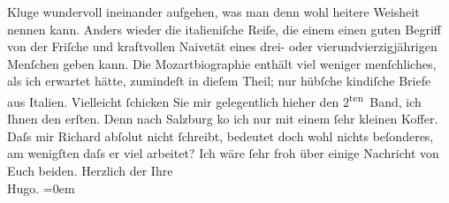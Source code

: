 \begin{ledgroupsized}[t]{13cm}
                    Kluge wundervoll ineinander aufgehen, was man denn wohl heitere {\pb}Weisheit nennen kann. Anders
                    wieder die italieniſche Reiſe, die einem einen
                    guten Begriff von der Friſche und kraftvollen Naivetät eines drei- oder
                    vierundvierzigjährigen Menſchen geben kann.\pend
           \pstart
           Die Mozartbiographie enthält viel
                    weniger menſchliches, als ich erwartet hätte, zumindeſt in dieſem Theil; nur
                    hübſche kindiſche Briefe aus Italien.
                    Vielleicht ſchicken Sie mir gelegentlich hieher den 2\textsuperscript{ten} Band, ich Ihnen {\pb}den erſten. Denn nach Salzburg ko{\geminationm} ich nur mit einem ſehr kleinen Koffer. Daſs mir
                        Richard abſolut nicht ſchreibt, bedeutet
                    doch wohl nichts beſonderes, am wenigſten daſs er viel arbeitet?\pend
           \pstart
           Ich wäre ſehr froh über einige Nachricht von Euch beiden.\pend
           \pstart
           Herzlich der Ihre{\\[\baselineskip]}\spacefill\mbox{Hugo.}\pend
           \leftskip=0em{}
         
         \endnumbering{}\end{ledgroupsized}  \newcommand{\dateiname}{L00693}\newcommand{\titel}{Hugo von Hofmannsthal an Arthur Schnitzler, 6. 7. [1897]}\newcommand{\editorInnen}{Martin Anton Müller und Gerd-Hermann Susen}
      
